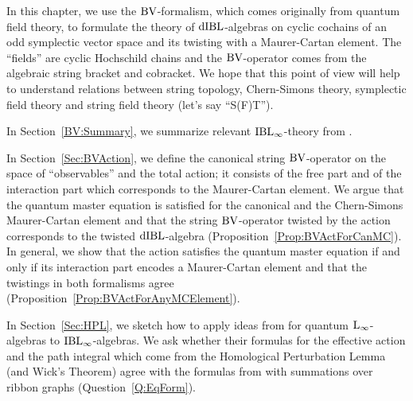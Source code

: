 \documentclass[\MainFolder/Text.tex]{subfiles}
\begin{document}
In this chapter, we use the $\mathrm{BV}$-formalism, which comes originally from quantum field theory, to formulate the theory of $\mathrm{dIBL}$-algebras on cyclic cochains of an odd symplectic vector space and its twisting with a Maurer-Cartan element.
The ``fields'' are cyclic Hochschild chains and the $\mathrm{BV}$-operator comes from the algebraic string bracket and cobracket.
We hope that this point of view will help to understand relations between string topology, Chern-Simons theory, symplectic field theory and string field theory (let's say ``S(F)T'').

In Section~\ref{BV:Summary}, we summarize relevant $\mathrm{IBL}_\infty$-theory from \cite{Cieliebak2015}.

In Section~\ref{Sec:BVAction}, we define the canonical string $\mathrm{BV}$-operator on the space of ``observables'' and the total action; it consists of the free part and of the interaction part which corresponds to the Maurer-Cartan element.
We argue that the quantum master equation is satisfied for the canonical and the Chern-Simons Maurer-Cartan element and that the string $\mathrm{BV}$-operator twisted by the action corresponds to the twisted $\mathrm{dIBL}$-algebra (Proposition~\ref{Prop:BVActForCanMC}).
In general, we show that the action satisfies the quantum master equation if and only if its interaction part encodes a Maurer-Cartan element and that the twistings in both formalisms agree (Proposition~\ref{Prop:BVActForAnyMCElement}).

In Section~\ref{Sec:HPL}, we sketch how to apply ideas from \cite{Doubek2018} for quantum $\mathrm{L}_\infty$-algebras to $\mathrm{IBL}_\infty$-algebras.
We ask whether their formulas for the effective action and the path integral which come from the Homological Perturbation Lemma (and Wick's Theorem) agree with the formulas from \cite{Cieliebak2015} with summations over ribbon graphs (Question~\ref{Q:EqForm}).
\end{document}
